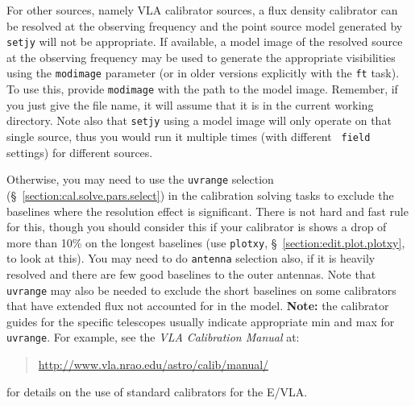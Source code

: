 For other sources, namely VLA calibrator sources, a flux density
calibrator can be resolved at the observing frequency and the point
source model generated by {\tt setjy} will not be appropriate.  If
available, a model image of the resolved source at the observing
frequency may be used to generate the appropriate visibilities using
the {\tt modimage} parameter (or in older versions explicitly with the
{\tt ft} task).  To use this, provide {\tt modimage} with the path to
the model image.  Remember, if you just give the file name, it will
assume that it is in the current working directory.  Note also that
{\tt setjy} using a model image will only operate on that single
source, thus you would run it multiple times (with different {\tt
  field} settings) for different sources.

Otherwise, you may need to use the {\tt uvrange} selection
(\S~\ref{section:cal.solve.pars.select}) in the calibration solving
tasks to exclude the baselines where the resolution effect is
significant.  There is not hard and fast rule for this, though you
should consider this if your calibrator is shows a drop of more than
10\% on the longest baselines (use {\tt plotxy},
\S~\ref{section:edit.plot.plotxy}, to look at this).  You may need to
do {\tt antenna} selection also, if it is heavily resolved and there
are few good baselines to the outer antennas.  Note that {\tt uvrange}
may also be needed to exclude the short baselines on some calibrators
that have extended flux not accounted for in the model.  {\bf Note:}
the calibrator guides for the specific telescopes usually indicate
appropriate min and max for {\tt uvrange}. For example, see the {\em
  VLA Calibration Manual} at:
\begin{quote}
   \url{http://www.vla.nrao.edu/astro/calib/manual/}
\end{quote}
for details on the use of standard calibrators for the E/VLA.

